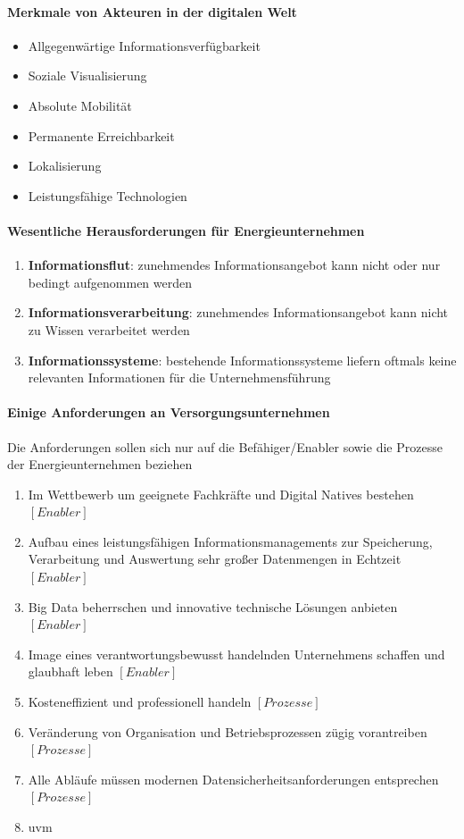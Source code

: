 \paragraph{Merkmale von Akteuren in der digitalen Welt}
\begin{itemize}
  \item Allgegenwärtige Informationsverfügbarkeit
  \item Soziale Visualisierung
  \item Absolute Mobilität
  \item Permanente Erreichbarkeit
  \item Lokalisierung
  \item Leistungsfähige Technologien
\end{itemize}

\paragraph{Wesentliche Herausforderungen für Energieunternehmen \citep[S. 21]{Doleski2016}}
\begin{enumerate}
  \item \textbf{Informationsflut}: zunehmendes Informationsangebot kann nicht oder nur bedingt aufgenommen werden
  \item \textbf{Informationsverarbeitung}: zunehmendes Informationsangebot kann nicht zu Wissen verarbeitet werden
  \item \textbf{Informationssysteme}: bestehende Informationssysteme liefern oftmals keine relevanten Informationen für die Unternehmensführung
\end{enumerate}
%


\paragraph{Einige Anforderungen an Versorgungsunternehmen}
Die Anforderungen sollen sich nur auf die Befähiger/Enabler sowie die Prozesse der Energieunternehmen beziehen
\begin{enumerate}
  \item Im Wettbewerb um geeignete Fachkräfte und Digital Natives bestehen $[Enabler]$
  \item Aufbau eines leistungsfähigen Informationsmanagements zur Speicherung, Verarbeitung und Auswertung sehr großer Datenmengen in Echtzeit $[Enabler]$
  \item Big Data beherrschen und innovative technische Lösungen anbieten $[Enabler]$
  \item Image eines verantwortungsbewusst handelnden Unternehmens schaffen und glaubhaft leben $[Enabler]$
  \item Kosteneffizient und professionell handeln $[Prozesse]$
  \item Veränderung von Organisation und Betriebsprozessen zügig vorantreiben $[Prozesse]$
  \item Alle Abläufe müssen modernen Datensicherheitsanforderungen entsprechen $[Prozesse]$
  \item uvm
\end{enumerate}



